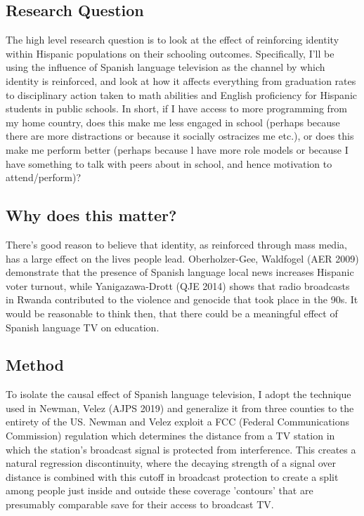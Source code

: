 \documentclass{article}
\begin{document}
\subsection*{Research Question}

The high level research question is to look at the effect of reinforcing identity within Hispanic populations on their schooling outcomes. Specifically, I'll be using the influence of Spanish language television as the channel by which identity is reinforced, and look at how it affects everything from graduation rates to disciplinary action taken to math abilities and English proficiency for Hispanic students in public schools. In short, if I have access to more programming from my home country, does this make me less engaged in school (perhaps because there are more distractions or because it socially ostracizes me etc.), or does this make me perform better (perhaps because l have more role models or because I have something to talk with peers about in school, and hence motivation to attend/perform)?

\subsection*{Why does this matter?}

There's good reason to believe that identity, as reinforced through mass media, has a large effect on the lives people lead.   Oberholzer-Gee, Waldfogel (AER 2009) demonstrate that the presence of Spanish language local news increases Hispanic voter turnout, while Yanigazawa-Drott (QJE 2014) shows that radio broadcasts in Rwanda contributed to the violence and genocide that took place in the 90s. It would be reasonable to think then, that there could be a meaningful effect of Spanish language TV on education. 

\subsection*{Method}

To isolate the causal effect of Spanish language television, I adopt the technique used in Newman, Velez (AJPS 2019) and generalize it from three counties to the entirety of the US. Newman and Velez exploit a FCC (Federal Communications Commission) regulation which determines the distance from a TV station in which the station's broadcast signal is protected from interference. This creates a natural regression discontinuity, where the decaying strength of a signal over distance is combined with this cutoff in broadcast protection to create a split among people just inside and outside these coverage 'contours' that are presumably comparable save for their access to broadcast TV. 
\end{document}
